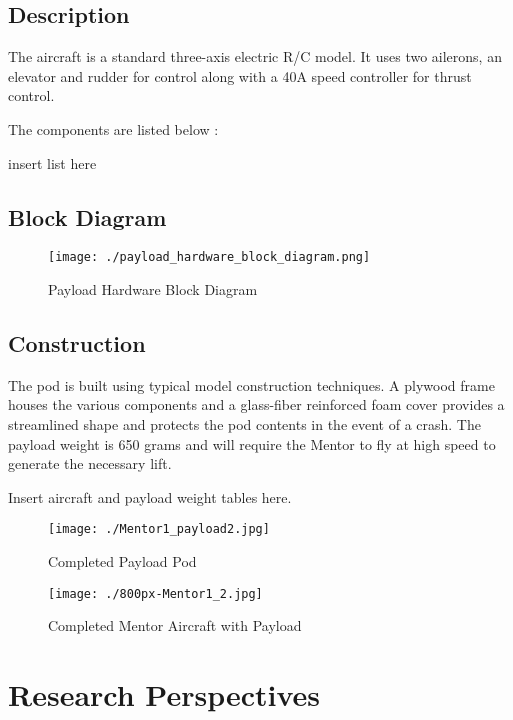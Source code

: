 \documentclass[a4paper,11pt]{report}
\begin{document}
\section{Description}

The aircraft is a standard three-axis electric R/C model. It uses two ailerons, an elevator and rudder for control along with a 40A speed controller for thrust control.

The components are listed below :

insert list here

\section{Block Diagram}

\begin{figure}[h]
 \centering
 \texttt{[image: ./payload\_hardware\_block\_diagram.png]}
 \caption{Payload Hardware Block Diagram}
 \label{fig:hwdiagram}
\end{figure}


\section{Construction}

The pod is built using typical model construction techniques. A plywood frame houses the various components and a glass-fiber reinforced foam cover provides a streamlined shape and protects the pod contents in the event of a crash. The payload weight is 650 grams and will require the Mentor to fly at high speed to generate the necessary lift.

Insert aircraft and payload weight tables here.

\begin{figure}[h]
 \centering
 \texttt{[image: ./Mentor1\_payload2.jpg]}
 \caption{Completed Payload Pod}
 \label{fig:payload}
\end{figure}

\begin{figure}[h]
 \centering
 \texttt{[image: ./800px-Mentor1\_2.jpg]}
 \caption{Completed Mentor Aircraft with Payload}
 \label{fig:mentor}
\end{figure}

 
\chapter{Research Perspectives}
\end{document}
